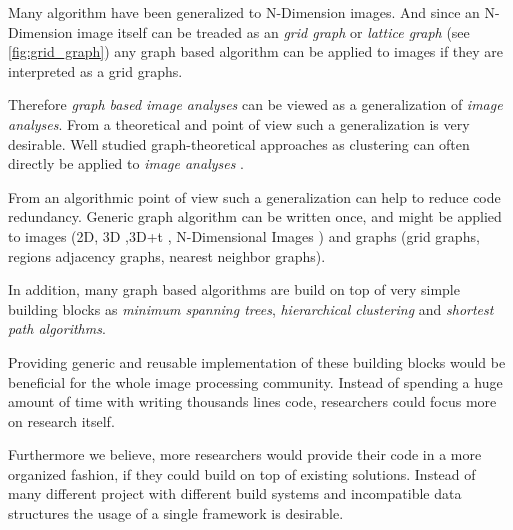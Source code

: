 
Many algorithm have been generalized to N-Dimension images.
And since an N-Dimension image itself can be treaded as an \emph{grid graph} or \emph{lattice graph} (see \cref{fig:grid_graph}) any graph based algorithm can be applied to images if they are interpreted as a grid graphs.

Therefore \emph{graph based image analyses} can be viewed as a generalization of \emph{image analyses}.
From a theoretical and  point of view such a generalization is very desirable.
Well studied graph-theoretical approaches as clustering can often directly be applied 
to  \emph{image analyses} \cite{vlachos_1993_csv,arbelaez_2006_cvpr,ohlander_1978_cgip}.

From an algorithmic point of view such a generalization can help to reduce 
code redundancy.
Generic graph algorithm can be written once, and might be applied 
to images (2D, 3D ,3D+t , N-Dimensional Images ) and graphs (grid graphs, 
regions adjacency graphs, nearest neighbor graphs).

In addition, many graph based algorithms are build on top of
very simple building blocks 
as \emph{minimum spanning trees}, \emph{hierarchical clustering} and 
\emph{shortest path algorithms}. 

Providing generic and reusable implementation of these building blocks
would be beneficial for the whole image processing community.
Instead of spending a huge amount of time with writing thousands lines code,
researchers could focus more on research itself.

Furthermore we believe, more researchers would provide their code in a more organized fashion, if 
they could build on top of existing solutions.
Instead of many different project with different build systems and incompatible data structures
the usage of a single framework is desirable.







